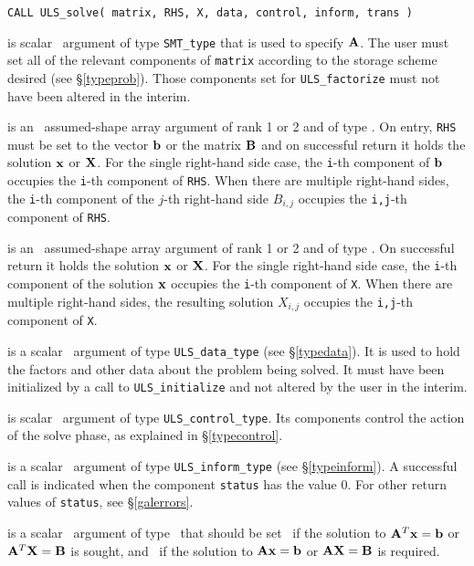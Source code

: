 \documentclass{galahad}
\newcommand{\packagename}{ULS}
\begin{document}
\hskip0.5in
{\tt CALL \packagename\_solve( matrix, RHS, X, data, control, inform, trans )}

\begin{description}

 is scalar \intentin\ argument of type {\tt SMT\_type}
that is used to specify ${\mathbf{A}}$.
The user must set all of the relevant components of {\tt matrix} according
to the storage scheme desired (see \S\ref{typeprob}). Those components
set for {\tt \packagename\_factorize} must not have been altered in the interim.

 is an \intentin\ assumed-shape array argument of rank 1 or 2
and of type \realdp.  On entry, {\tt RHS} must be set
to the vector ${\mathbf{b}}$ or the matrix ${\mathbf{B}}$ and on successful return it holds
the solution ${\mathbf{x}}$ or ${\mathbf{X}}$. For the single right-hand side case, the
{\tt i}-th component of ${\mathbf{b}}$
occupies the {\tt i}-th component of {\tt RHS}. When there are multiple
right-hand sides, the {\tt i}-th component of the $j$-th right-hand side $B_{i,j}$
occupies the {\tt i,j}-th component of {\tt RHS}.

 is an \intentinout\ assumed-shape array argument of rank 1 or 2
and of type \realdp.  On successful return it holds
the solution ${\mathbf{x}}$ or ${\mathbf{X}}$. For the single right-hand side case, the
{\tt i}-th component of the solution ${\mathbf{x}}$
occupies the {\tt i}-th component of {\tt X}. When there are multiple
right-hand sides, the resulting solution $X_{i,j}$ occupies the
{\tt i,j}-th component of {\tt X}.

 is a scalar \intentinout\ argument of type
{\tt \packagename\_data\_type}
(see \S\ref{typedata}). It is used to hold the factors and other
data about the problem being solved.
It must have been initialized by a call to
{\tt \packagename\_ini\-tialize} and not altered by the user in the interim.

 is scalar \intentin\ argument of type
{\tt \packagename\_control\_type}. Its components control the action
of the solve phase, as explained in
\S\ref{typecontrol}.

 is a scalar \intentinout\ argument of type
{\tt \packagename\_inform\_type}
(see \S\ref{typeinform}).
A successful call is indicated when the  component {\tt status} has the value 0.
For other return values of {\tt status}, see \S\ref{galerrors}.

 is a scalar \intentin\ argument of type \logical\ that should be
set \true\ if the solution to ${\mathbf{A}}^T {\mathbf{x}} = {\mathbf{b}}$ or ${\mathbf{A}}^T {\mathbf{X}} = {\mathbf{B}}$
is sought, and \false\ if the solution to ${\mathbf{A}} {\mathbf{x}} = {\mathbf{b}}$ or
${\mathbf{A}} {\mathbf{X}} = {\mathbf{B}}$ is required.

\end{description}
\end{document}

